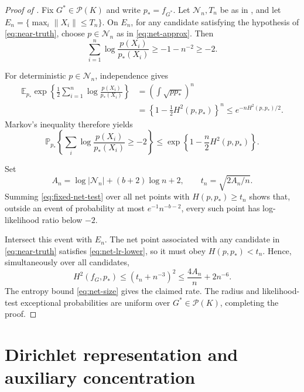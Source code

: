 \documentclass[11pt]{article}
\theoremstyle{definition}
\theoremstyle{remark}
\newcommand{\Pcal}{\mathcal P}
\newcommand{\Ncal}{\mathcal N}
\newcommand{\EE}{\mathbb E}
\newcommand{\PP}{\mathbb P}
\newcommand{\norm}[1]{\lVert #1\rVert}
\newcommand{\abs}[1]{\lvert #1\rvert}
\begin{document}
\begin{proof}[Proof of ]
Fix $G^*\in\Pcal(K)$ and write
$p_*=f_{G^*}$.  Let $\Ncal_n,T_n$ be as in , and let
$E_n=\{\max_i\norm{X_i}\le T_n\}$.  On $E_n$, for any candidate satisfying
the hypothesis of \eqref{eq:near-truth}, choose $p\in\Ncal_n$ as in
\eqref{eq:net-approx}.  Then
\begin{equation}\label{eq:net-lr-lower}
 \sum_{i=1}^n\log\frac{p(X_i)}{p_*(X_i)}
 \ge-1-n^{-2}\ge-2.
\end{equation}

For deterministic $p\in\Ncal_n$,
independence gives
\begin{align*}
 \EE_{p_*}\exp\left\{\frac12\sum_{i=1}^n
       \log\frac{p(X_i)}{p_*(X_i)}\right\}
 &=\left(\int\sqrt{pp_*}\right)^n\\
 &=\left\{1-\frac12H^2(p,p_*)\right\}^n
 \le e^{-nH^2(p,p_*)/2}.
\end{align*}
Markov's inequality therefore yields
\begin{equation}\label{eq:fixed-net-test}
 \PP_{p_*}\left\{\sum_i\log\frac{p(X_i)}{p_*(X_i)}\ge-2\right\}
 \le\exp\left\{1-\frac n2H^2(p,p_*)\right\}.
\end{equation}

Set
\[
 A_n=\log\abs{\Ncal_n}+(b+2)\log n+2,
 \qquad t_n=\sqrt{2A_n/n}.
\]
Summing \eqref{eq:fixed-net-test} over all net points with
$H(p,p_*)\ge t_n$ shows that, outside an event of probability at most
$e^{-1}n^{-b-2}$, every such point has log-likelihood ratio below $-2$.

Intersect this event with $E_n$.  The net point
associated with any candidate in \eqref{eq:near-truth} satisfies
\eqref{eq:net-lr-lower}, so it must obey $H(p,p_*)<t_n$.  Hence,
simultaneously over all candidates,
\[
 H^2(f_G,p_*)\le(t_n+n^{-3})^2
 \le\frac{4A_n}{n}+2n^{-6}.
\]
The entropy bound \eqref{eq:net-size} gives the claimed rate.  The radius and
likelihood-test exceptional probabilities are uniform over
$G^*\in\Pcal(K)$, completing the proof.
\end{proof}

\section{Dirichlet representation and auxiliary concentration}
\label{app:dirichlet}
\end{document}
